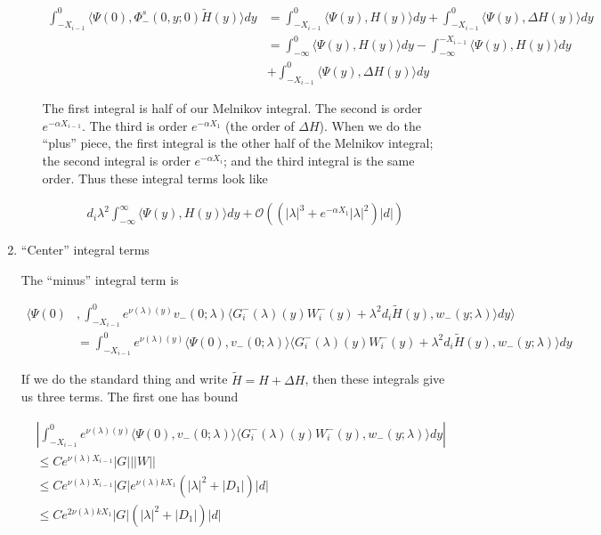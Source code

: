 \documentclass[12pt]{article}
\begin{document}
\begin{enumerate}
\begin{enumerate}[(i)]
\begin{align*}
\int_{-X_{i-1}}^0 \langle \Psi(0), \Phi^s_-(0, y; 0) \tilde{H}(y) \rangle dy &= 
\int_{-X_{i-1}}^0 \langle \Psi(y), H(y) \rangle dy + \int_{-X_{i-1}}^0 \langle \Psi(y), \Delta H(y) \rangle dy \\
&= \int_{-\infty}^0 \langle \Psi(y), H(y) \rangle dy - \int_{-\infty}^{-X_{i-1}} \langle \Psi(y), H(y) \rangle dy \\
&+ \int_{-X_{i-1}}^0 \langle \Psi(y), \Delta H(y) \rangle dy 
\end{align*}

The first integral is half of our Melnikov integral. The second is order $e^{-\alpha X_{i-1}}$. The third is order $e^{-\alpha X_1}$ (the order of $\Delta H$). When we do the ``plus'' piece, the first integral is the other half of the Melnikov integral; the second integral is order $e^{-\alpha X_i}$; and the third integral is the same order.
Thus these integral terms look like

\begin{align*}
d_i \lambda^2 \int_{-\infty}^\infty \langle \Psi(y), H(y) \rangle dy + \mathcal{O}( ( |\lambda|^3 + e^{-\alpha X_1} |\lambda|^2 )|d|)
\end{align*}

\end{enumerate}

\item ``Center'' integral terms

The ``minus'' integral term is

\begin{align*}
\langle \Psi(0) &, \int_{-X_{i-1}}^0
e^{\nu(\lambda)(y)} v_-(0; \lambda) \langle G_i^-(\lambda)(y)W_i^-(y) + \lambda^2 d_i \tilde{H}(y), w_-(y; \lambda) \rangle dy \rangle \\
&= \int_{-X_{i-1}}^0
e^{\nu(\lambda)(y)} \langle \Psi(0), v_-(0; \lambda) \rangle \langle G_i^-(\lambda)(y)W_i^-(y) + \lambda^2 d_i \tilde{H}(y), w_-(y; \lambda) \rangle dy 
\end{align*}

If we do the standard thing and write $\tilde{H} = H + \Delta H$, then these integrals give us three terms. The first one has bound

\begin{align*}
&\left| \int_{-X_{i-1}}^0
e^{\nu(\lambda)(y)} \langle \Psi(0), v_-(0; \lambda) \rangle \langle G_i^-(\lambda)(y)W_i^-(y), w_-(y; \lambda) \rangle dy \right| \\
&\leq C e^{\nu(\lambda) X_{i-1}} |G| ||W|| \\
&\leq C e^{\nu(\lambda) X_{i-1}} |G| e^{\nu(\lambda)k X_1} ( |\lambda|^2 + |D_1| )|d| \\
&\leq C e^{2 \nu(\lambda) k X_1} |G| ( |\lambda|^2 + |D_1| )|d|
\end{align*}


\end{enumerate}
\end{document}
